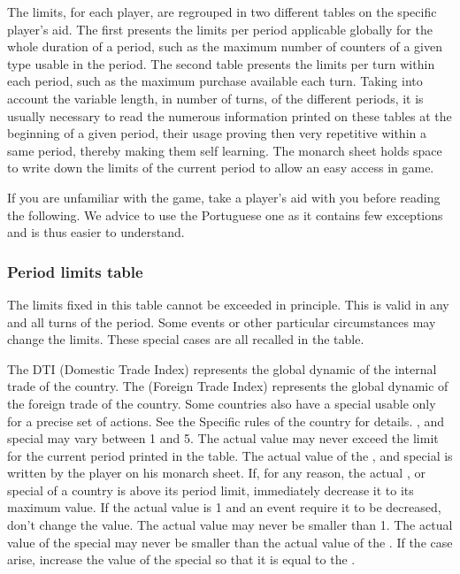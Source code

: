  The limits, for each player, are regrouped in two
different tables on the specific player's aid. The first presents the limits
per period applicable globally for the whole duration of a period, such as the
maximum number of counters of a given type usable in the period. The second
table presents the limits per turn within each period, such as the maximum
purchase available each turn.
\bparag Taking into account the variable length, in number of turns, of the
different periods, it is usually necessary to read the numerous information
printed on these tables at the beginning of a given period, their usage
proving then very repetitive within a same period, thereby making them self
learning.
\bparag The monarch sheet holds space to write down the limits of the current
period to allow an easy access in game.

\begin{exemple}
  If you are unfamiliar with the game, take a player's aid with you before
  reading the following. We advice to use the Portuguese one as it contains
  few exceptions and is thus easier to understand.
\end{exemple}


\subsubsection{Period limits table}
\label{chThePowers:Period Limits}
\aparag The limits fixed in this table cannot be exceeded in principle. This
is valid in any and all turns of the period.
\bparag Some events or other particular circumstances may change the
limits. These special cases are all recalled in the table.

\aparag[Trade] The DTI (Domestic Trade Index) represents the global dynamic of
the internal trade of the country. The \FTI (Foreign Trade Index) represents
the global dynamic of the foreign trade of the country.
\bparag Some countries also have a special \FTI usable only for a precise set
of actions. See the Specific rules of the country for details.
\bparag \DTI, \FTI and special \FTI may vary between 1 and 5.
\bparag The actual value may never exceed the limit for the current period
printed in the table.
\bparag The actual value of the \DTI, \FTI and special \FTI is written by the
player on his monarch sheet.
\bparag If, for any reason, the actual \DTI, \FTI or special \FTI of a country
is above its period limit, %
immediately decrease it to its maximum value.
\bparag If the actual value is 1 and an event require it to be decreased, %
don't change the value. The actual value may never be smaller than 1.
\bparag The actual value of the special \FTI may never be smaller than the
actual value of the \FTI. If the case arise, increase the value of the special
\FTI so that it is equal to the \FTI.

